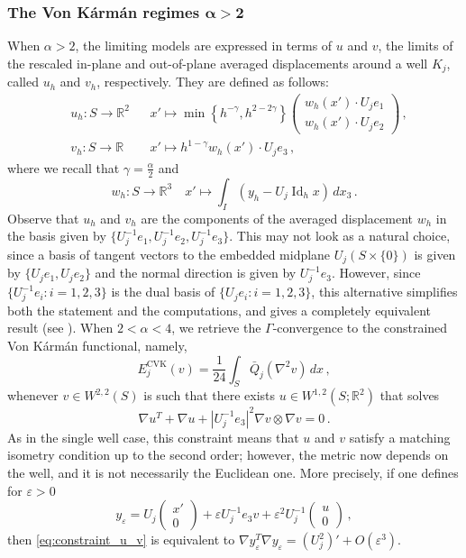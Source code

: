 \documentclass{article}
\theoremstyle{plain}
\theoremstyle{plain}
\theoremstyle{plain}
\theoremstyle{plain}
\theoremstyle{plain}
\theoremstyle{definition}
\theoremstyle{definition}
\renewcommand{\r}{\mathbb{R}}
\DeclareMathOperator{\Id}{Id}
\DeclareMathOperator{\CVK}{CVK}
\begin{document}
\subsubsection{The Von K\'arm\'an regimes \texorpdfstring{$\bm{\alpha > 2}$}{ > 2}}\label{subsection:von_karman}

When $\alpha > 2$, the limiting models are expressed in terms of $u$ and $v$, the limits of the rescaled in-plane and out-of-plane averaged displacements around a well $K_j$, called $u_h$ and $v_h$, respectively. They are defined as follows:
\begin{align}
    & u_h \colon S \to \r^2 && x' \mapsto \min\left\{h^{-\gamma}, h^{2-2 \gamma}\right\}\begin{pmatrix}
         w_h(x') \cdot U_j e_1\\
         w_h(x') \cdot U_j e_2 
    \end{pmatrix}\,, \label{eq:definition_u}\\
    & v_h \colon S \to \r && x' \mapsto h^{1-\gamma} w_h(x') \cdot U_j e_3 \,, \label{eq:definition_v}
\end{align}
where we recall that $\gamma = \frac{\alpha}{2}$ and
\[
    w_h \colon S \to \r^3 \quad x' \mapsto \int_I (y_h - U_j \Id_h x)\, dx_3 \,.
\]
Observe that $u_h$ and $v_h$ are the components of the averaged displacement $w_h$ in the basis given by $\{U_j^{-1}e_1, U_j^{-1}e_2, U_j^{-1}e_3\}$. This may not look as a natural choice, since a basis of tangent vectors to the embedded midplane $U_j(S \times \{0\})$ is given by $\{U_je_1, U_je_2\}$ and the normal direction is given by $U^{-1}_j e_3$.
However, since $ \{U_{j}^{-1}e_{i} : i = 1, 2, 3\} $ is the dual basis of $ \{U_{j}e_{i} : i = 1, 2, 3 \} $, this alternative simplifies both the statement and the computations, and gives a completely equivalent result (see ). When $2 < \alpha < 4$, we retrieve the $\Gamma$-convergence to the constrained Von K\'arm\'an functional, namely,
\[
    E^{\CVK}_j(v) = \dfrac{1}{24} \displaystyle\int_S \bar Q_j(\nabla^2 v) \, dx \,,
\]
whenever $v \in W^{2,2}(S)$ is such that there exists $u \in W^{1,2}(S; \r^2)$ that solves
\begin{equation}
	\nabla u^T + \nabla u + |U^{-1}_j e_3|^2 \nabla v \otimes \nabla v = 0 \,. \label{eq:constraint_u_v}
\end{equation}
As in the single well case, this constraint means that $u$ and $v$ satisfy a matching isometry condition up to the second order; however, the metric now depends on the well, and it is not necessarily the Euclidean one. More precisely, if one defines for $\varepsilon > 0$
\[
	y_\varepsilon = U_j \begin{pmatrix}
		x'\\ 0
	\end{pmatrix} + \varepsilon U_j^{-1}e_3 v + \varepsilon^2 U_j^{-1} \begin{pmatrix}
		u \\ 0
	\end{pmatrix} \,,
\]
then \eqref{eq:constraint_u_v} is equivalent to $\nabla y_\varepsilon^T \nabla y_\varepsilon = (U_j^2)' + O(\varepsilon^3)$.
\end{document}
